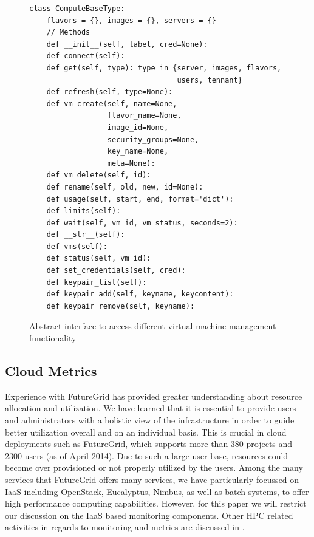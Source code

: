 \documentclass{tex/sig-alternate-2013}
\newcommand{\todo}[1]{{\color{red}{#1}}}
\begin{document}
{\begin{figure}[htb]
\begin{small}
\begin{verbatim}
class ComputeBaseType:
    flavors = {}, images = {}, servers = {}
    // Methods
    def __init__(self, label, cred=None):
    def connect(self):
    def get(self, type): type in {server, images, flavors, 
                                  users, tennant}
    def refresh(self, type=None):
    def vm_create(self, name=None,
                  flavor_name=None,
                  image_id=None,
                  security_groups=None,
                  key_name=None,
                  meta=None):
    def vm_delete(self, id):
    def rename(self, old, new, id=None):
    def usage(self, start, end, format='dict'):
    def limits(self):
    def wait(self, vm_id, vm_status, seconds=2):
    def __str__(self):
    def vms(self):
    def status(self, vm_id):
    def set_credentials(self, cred):
    def keypair_list(self):
    def keypair_add(self, keyname, keycontent):
    def keypair_remove(self, keyname):
\end{verbatim}
\end{small}
\vspace{-12pt}
\caption{Abstract interface to access different virtual machine
  management functionality}
\end{figure}



\subsection{Cloud Metrics}

\todo{READ}

Experience with FutureGrid has provided greater understanding about
resource allocation and utilization. We have learned that it is
essential to provide users and administrators with a holistic view of
the infrastructure in order to guide better utilization overall and on
an individual basis. This is crucial in cloud deployments such as
FutureGrid, which supports more than 380 projects and 2300 users (as
of April 2014). Due to such a large user base, resources could become
over provisioned or not properly utilized by the users. Among the many
services that FutureGrid offers many services, we have particularly
focussed on IaaS including OpenStack, Eucalyptus, Nimbus, as well as
batch systems, to offer high performance computing capabilities.
However, for this paper we will restrict our discussion on the IaaS
based monitoring components.  Other HPC related activities in regards
to monitoring and metrics are discussed in \cite{las13xdmod}.

}
\end{document}
